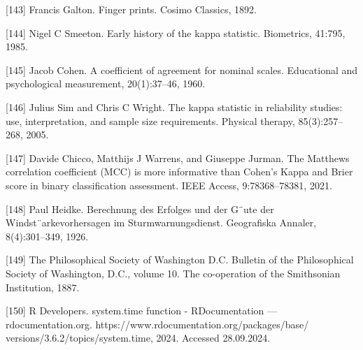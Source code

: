 \documentclass[preprint,12pt]{elsarticle}
\begin{document}
[143] Francis Galton. Finger prints. Cosimo Classics, 1892. 

[144] Nigel C Smeeton. Early history of the kappa statistic. Biometrics, 41:795, 1985. 

[145] Jacob Cohen. A coefficient of agreement for nominal scales. Educational and psychological measurement, 20(1):37–46, 1960. 

[146] Julius Sim and Chris C Wright. The kappa statistic in reliability studies: use, interpretation, and sample size requirements. Physical therapy, 85(3):257–268, 2005. 

[147] Davide Chicco, Matthijs J Warrens, and Giuseppe Jurman. The Matthews correlation coefficient (MCC) is more informative than Cohen’s Kappa and Brier score in binary classification assessment. IEEE Access, 9:78368–78381, 2021. 

[148] Paul Heidke. Berechnung des Erfolges und der G¨ute der Windst¨arkevorhersagen im Sturmwarnungsdienst. Geografiska Annaler, 8(4):301–349, 1926. 

[149] The Philosophical Society of Washington D.C. Bulletin of the Philosophical Society of Washington, D.C., volume 10. The co-operation of the Smithsonian Institution, 1887. 

[150] R Developers. system.time function - RDocumentation — rdocumentation.org. https://www.rdocumentation.org/packages/base/ versions/3.6.2/topics/system.time, 2024. Accessed 28.09.2024.
\end{document}
